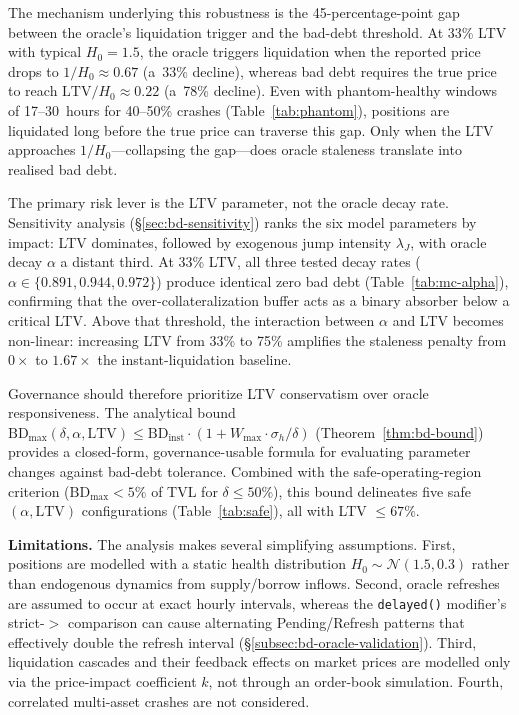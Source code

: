 \documentclass[10pt,a4paper,twocolumn]{article}
\theoremstyle{definition}
\theoremstyle{plain}
\theoremstyle{remark}
\begin{document}
The mechanism underlying this robustness is the 45-percentage-point gap between the oracle's liquidation trigger and the bad-debt threshold. At 33\% LTV with typical $H_0 = 1.5$, the oracle triggers liquidation when the reported price drops to $1/H_0 \approx 0.67$ (a~33\% decline), whereas bad debt requires the true price to reach $\text{LTV}/H_0 \approx 0.22$ (a~78\% decline). Even with phantom-healthy windows of 17--30~hours for 40--50\% crashes (Table~\ref{tab:phantom}), positions are liquidated long before the true price can traverse this gap. Only when the LTV approaches $1/H_0$---collapsing the gap---does oracle staleness translate into realised bad debt.

The primary risk lever is the LTV parameter, not the oracle decay rate. Sensitivity analysis (\S\ref{sec:bd-sensitivity}) ranks the six model parameters by impact: LTV dominates, followed by exogenous jump intensity $\lambda_J$, with oracle decay $\alpha$ a distant third. At 33\% LTV, all three tested decay rates ($\alpha \in \{0.891, 0.944, 0.972\}$) produce identical zero bad debt (Table~\ref{tab:mc-alpha}), confirming that the over-collateralization buffer acts as a binary absorber below a critical LTV. Above that threshold, the interaction between $\alpha$ and LTV becomes non-linear: increasing LTV from 33\% to 75\% amplifies the staleness penalty from $0\times$ to $1.67\times$ the instant-liquidation baseline.

Governance should therefore prioritize LTV conservatism over oracle responsiveness. The analytical bound $\text{BD}_{\max}(\delta, \alpha, \text{LTV}) \leq \text{BD}_{\text{inst}} \cdot (1 + W_{\max} \cdot \sigma_h / \delta)$ (Theorem~\ref{thm:bd-bound}) provides a closed-form, governance-usable formula for evaluating parameter changes against bad-debt tolerance. Combined with the safe-operating-region criterion ($\text{BD}_{\max} < 5\%$ of TVL for $\delta \leq 50\%$), this bound delineates five safe $(\alpha, \text{LTV})$ configurations (Table~\ref{tab:safe}), all with LTV $\leq 67\%$.

\textbf{Limitations.} The analysis makes several simplifying assumptions. First, positions are modelled with a static health distribution $H_0 \sim \mathcal{N}(1.5, 0.3)$ rather than endogenous dynamics from supply/borrow inflows. Second, oracle refreshes are assumed to occur at exact hourly intervals, whereas the \texttt{delayed()} modifier's strict-$>$ comparison can cause alternating Pending/Refresh patterns that effectively double the refresh interval (\S\ref{subsec:bd-oracle-validation}). Third, liquidation cascades and their feedback effects on market prices are modelled only via the price-impact coefficient $k$, not through an order-book simulation. Fourth, correlated multi-asset crashes are not considered.
\end{document}
